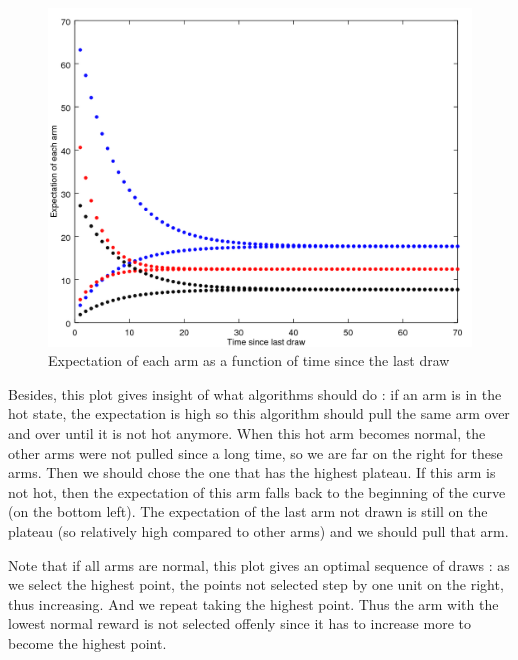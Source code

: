 \documentclass[french]{beamer}
\begin{document}
\begin{frame}
	\begin{figure}[h]
		\begin{center}
			\includegraphics[width=1.0\textwidth]{expectations.png}
		\end{center}
		\caption{Expectation of each arm as a function of time since the last draw}
	\end{figure}
	
	Besides, this plot gives insight of what algorithms should do : if an arm is in the hot state, the expectation is high so this algorithm should pull the same arm over and over until it is not hot anymore. When this hot arm becomes normal, the other arms were not pulled since a long time, so we are far on the right for these arms. Then we should chose the one that has the highest plateau. If this arm is not hot, then the expectation of this arm falls back to the beginning of the curve (on the bottom left). The expectation of the last arm not drawn is still on the plateau (so relatively high compared to other arms) and we should pull that arm.
	
	Note that if all arms are normal, this plot gives an optimal sequence of draws : as we select the highest point, the points not selected step by one unit on the right, thus increasing. And we repeat taking the highest point. Thus the arm with the lowest normal reward is not selected offenly since it has to increase more to become the highest point.
\end{frame}
\end{document}
